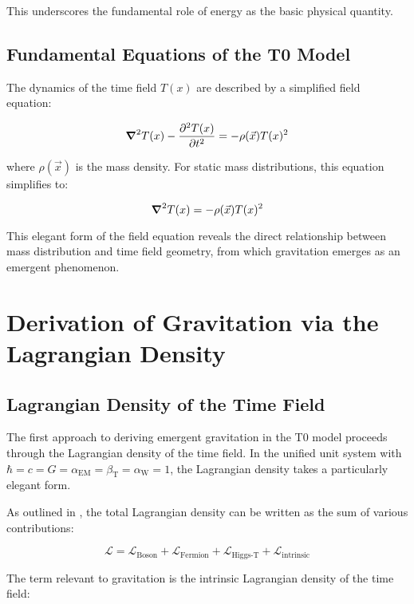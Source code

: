 \documentclass[12pt,a4paper]{article}
\newcommand{\Tfield}{T(x)}
\newcommand{\betaT}{\beta_{\text{T}}}
\newcommand{\alphaEM}{\alpha_{\text{EM}}}
\newcommand{\alphaW}{\alpha_{\text{W}}}
\newcommand{\vecx}{\vec{x}}
\begin{document}
	This underscores the fundamental role of energy as the basic physical quantity.
	
	\subsection{Fundamental Equations of the T0 Model}
	The dynamics of the time field \(\Tfield\) are described by a simplified field equation:
	
	\begin{equation}
		\grad^2 \Tfield - \frac{\partial^2 \Tfield}{\partial t^2} = -\rho(\vecx) \Tfield^2
	\end{equation}
	
	where \(\rho(\vecx)\) is the mass density. For static mass distributions, this equation simplifies to:
	
	\begin{equation}
		\grad^2 \Tfield = -\rho(\vecx) \Tfield^2
	\end{equation}
	
	This elegant form of the field equation reveals the direct relationship between mass distribution and time field geometry, from which gravitation emerges as an emergent phenomenon.
	
	\section{Derivation of Gravitation via the Lagrangian Density}
	
	\subsection{Lagrangian Density of the Time Field}
	The first approach to deriving emergent gravitation in the T0 model proceeds through the Lagrangian density of the time field. In the unified unit system with \(\hbar = c = G = \alphaEM = \betaT = \alphaW = 1\), the Lagrangian density takes a particularly elegant form.
	
	As outlined in \cite{pascher_messdifferenzen_2025}, the total Lagrangian density can be written as the sum of various contributions:
	
	\begin{equation}
		\mathcal{L} = \mathcal{L}_{\text{Boson}} + \mathcal{L}_{\text{Fermion}} + \mathcal{L}_{\text{Higgs-T}} + \mathcal{L}_{\text{intrinsic}}
	\end{equation}
	
	The term relevant to gravitation is the intrinsic Lagrangian density of the time field:
	
\end{document}
